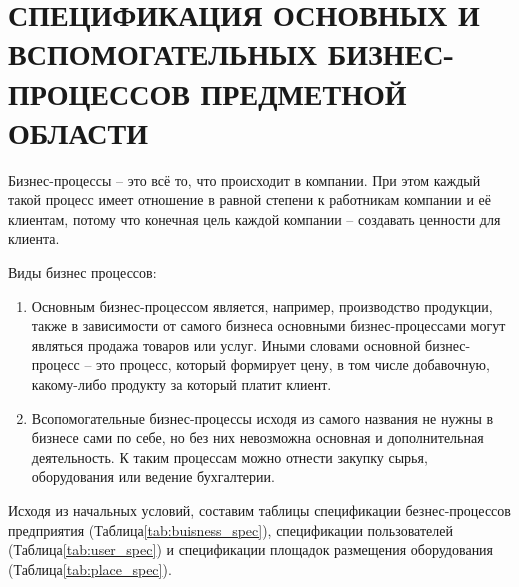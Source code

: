 \documentclass[14pt, a4paper]{extarticle}
\begin{document}
\section[СПЕЦИФИКАЦИЯ ОСНОВНЫХ И ВСПОМОГАТЕЛЬНЫХ БИЗНЕС-ПРОЦЕССОВ ПРЕДМЕТНОЙ ОБЛАСТИ]{СПЕЦИФИКАЦИЯ ОСНОВНЫХ И \\ВСПОМОГАТЕЛЬНЫХ БИЗНЕС-ПРОЦЕССОВ ПРЕДМЕТНОЙ ОБЛАСТИ}

Бизнес-процессы – это всё то, что происходит в компании. При этом каждый такой процесс имеет отношение в равной степени к работникам компании и её клиентам, потому что конечная цель каждой компании – создавать ценности для клиента. 

Виды бизнес процессов:
\begin{enumerate}
    \item Основным бизнес-процессом является, например, производство продукции, также в зависимости от самого бизнеса основными бизнес-процессами могут являться продажа товаров или услуг. Иными словами основной бизнес-процесс -- это процесс, который формирует цену, в том числе добавочную, какому-либо продукту за который платит клиент.  
    \item Всопомогательные бизнес-процессы исходя из самого названия не нужны в бизнесе сами по себе, но без них невозможна основная и дополнительная деятельность. К таким процессам можно отнести закупку сырья, оборудования или ведение бухгалтерии.
\end{enumerate}

Исходя из начальных условий, составим таблицы спецификации безнес-процессов предприятия (Таблица\;\ref{tab:buisness_spec}), спецификации пользователей (Таблица\;\ref{tab:user_spec}) и спецификации площадок размещения оборудования (Таблица\;\ref{tab:place_spec}).
\end{document}
